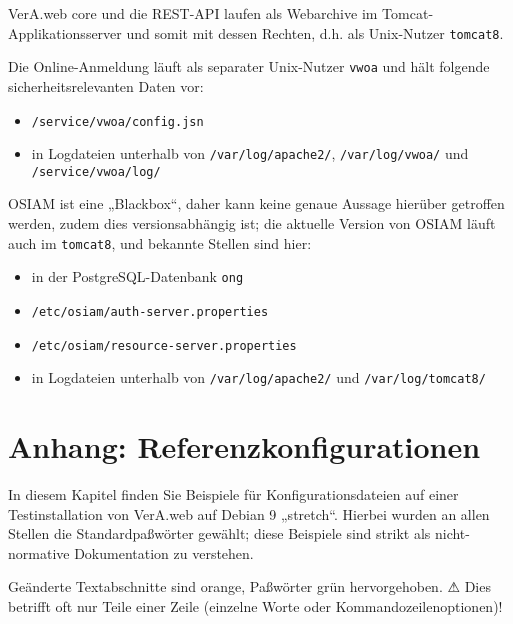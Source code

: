 \documentclass{tarentanleitung}
\begin{document}
VerA.web core und die REST-API laufen als Webarchive im
Tomcat-Applikationsserver und somit mit dessen Rechten,
d.h. als Unix-Nutzer \texttt{tomcat8}.

Die Online-Anmeldung läuft als separater Unix-Nutzer \texttt{vwoa}
und hält folgende sicherheitsrelevanten Daten vor:\keinumbruch

\begin{itemize}
 \item{\texttt{/service/vwoa/config.jsn}}
 \item{in Logdateien unterhalb von \texttt{/var/log/apache2/},
  \texttt{/var/log/vwoa/} und \texttt{/service/vwoa/log/}}
\end{itemize}

OSIAM ist eine „Blackbox“, daher kann keine genaue Aussage hierüber getroffen
werden, zudem dies versionsabhängig ist; die aktuelle Version von OSIAM läuft
auch im \texttt{tomcat8}, und bekannte Stellen sind hier:\keinumbruch

\begin{itemize}
 \item{in der PostgreSQL-Datenbank \texttt{ong}}
 \item{\texttt{/etc/osiam/auth-server.properties}}
 \item{\texttt{/etc/osiam/resource-server.properties}}
 \item{in Logdateien unterhalb von \texttt{/var/log/apache2/}
  und \texttt{/var/log/tomcat8/}}
\end{itemize}

\section{Anhang: Referenzkonfigurationen}\label{sec:refcfg}

In diesem Kapitel finden Sie Beispiele für Konfigurationsdateien
auf einer Testinstallation von VerA.web auf Debian 9 „stretch“.
Hierbei wurden an allen Stellen die Standardpaßwörter gewählt;
diese Beispiele sind strikt als nicht-normative Dokumentation
zu verstehen.


{\color{RedOrange} Geänderte Textabschnitte} sind orange,
{\color{ForestGreen} Paßwörter} grün hervorgehoben. ⚠ Dies
betrifft oft nur Teile einer Zeile (einzelne Worte oder
Kommandozeilenoptionen)!
\end{document}
